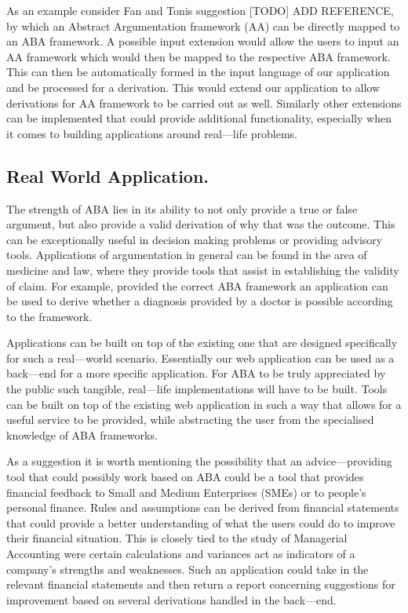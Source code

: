 As an example consider Fan and Tonis suggestion [TODO] ADD REFERENCE, by which an Abstract Argumentation framework (AA) can be directly mapped to an ABA framework. A possible input extension would allow the users to input an AA framework which would then be mapped to the respective ABA framework. This can then be automatically formed in the input language of our application and be processed for a derivation. This would extend our application to allow derivations for AA framework to be carried out as well. Similarly other extensions can be implemented that could provide additional functionality, especially when it comes to building applications around real---life problems.


\subsection{Real World Application.}
The strength of ABA lies in its ability to not only provide a true or false argument, but also provide a valid derivation of why that was the outcome. This can be exceptionally useful in decision making problems or providing advisory tools. Applications of argumentation in general can be found in the area of medicine and law, where they provide tools that assist in establishing the validity of claim. For example, provided the correct ABA framework an application can be used to derive whether a diagnosis provided by a doctor is possible according to the framework.

Applications can be built on top of the existing one that are designed specifically for such a real---world scenario. Essentially our web application can be used as a back---end for a more specific application. For ABA to be truly appreciated by the public such tangible, real---life implementations will have to be built. Tools can be built on top of the existing web application in such a way that allows for a useful service to be provided, while abstracting the user from the specialised knowledge of ABA frameworks.

As a suggestion it is worth mentioning the possibility that an advice---providing tool that could possibly work based on ABA could be a tool that provides financial feedback to Small and Medium Enterprises (SMEs) or to people's personal finance. Rules and assumptions can be derived from financial statements that could provide a better understanding of what the users could do to improve their financial situation. This is closely tied to the study of Managerial Accounting were certain calculations and variances act as indicators of a company's strengths and weaknesses. Such an application could take in the relevant financial statements and then return a report concerning suggestions for improvement based on several derivations handled in the back---end.

